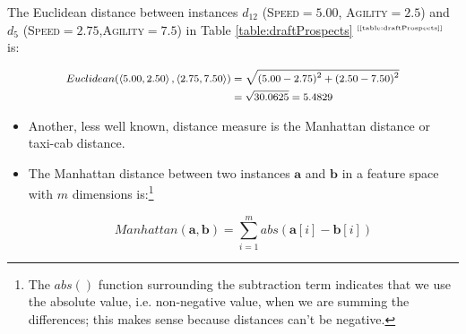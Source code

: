 \documentclass[xcolor={table}]{beamer}
\newcommand{\featN}[1]{\textsc{#1}}
\newcommand{\ourRef}[1]{\ref{#1} $^{\text{\tiny[\pageref{#1}]}}$}
\begin{document}
 \begin{frame} 
 \begin{example} 
The Euclidean distance between instances $d_{12}$ (\featN{Speed}$= 5.00$, \featN{Agility}$=2.5$) and $d_5$ (\featN{Speed}$=2.75$,\featN{Agility}$=7.5$) in Table \ourRef{table:draftProspects} is:
 
  \begin{overprint}
             \begin{equation*}
			\footnotesize
			\begin{alignedat}{2}
			Euclidean(\left<5.00,2.50\right>,\left<2.75,7.50\right>) &= 
			\sqrt{\left( 5.00 - 2.75\right )^2 + \left( 2.50 - 7.50 \right)^2}\\
			& = \sqrt{30.0625}=5.4829
			\end{alignedat}
			\label{eq:euclidexample}
		\end{equation*}
\end{overprint}
        

\end{example} 
\end{frame} 

 \begin{frame} 
\begin{itemize}
\item Another, less well known, distance measure is the \alert{Manhattan} distance or \alert{taxi-cab distance}. 
\item The Manhattan distance between two instances $\textbf{a}$ and $\textbf{b}$ in a feature space with $m$ dimensions is:\footnote{The $abs()$ function surrounding the subtraction term indicates that we use the absolute value, i.e. non-negative value, when we are summing the differences; this makes sense because distances can't be negative.}
 
\begin{equation}
Manhattan(\textbf{a},\textbf{b}) = \sum_{i=1}^{m} abs(\textbf{a}[i] - \textbf{b}[i])
\label{eq:taxi}
\end{equation}

\end{itemize}
\end{frame} 
\end{document}
